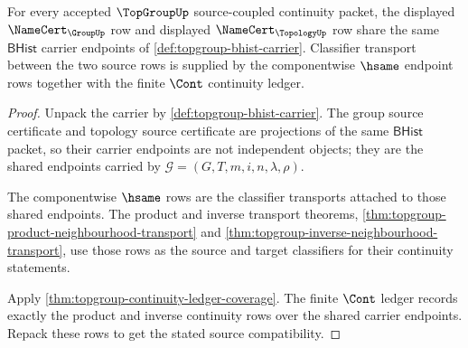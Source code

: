 \begin{theorem}
\label{thm:topgroup-root-source-compatibility}
For every accepted $\TopGroupUp$ source-coupled continuity packet, the displayed
$\NameCert_{\GroupUp}$ row and displayed $\NameCert_{\TopologyUp}$ row share the
same $\mathsf{BHist}$ carrier endpoints of
\autoref{def:topgroup-bhist-carrier}. Classifier transport between the two
source rows is supplied by the componentwise $\hsame$ endpoint rows together
with the finite $\Cont$ continuity ledger.
\end{theorem}
\begin{proof}
Unpack the carrier by \autoref{def:topgroup-bhist-carrier}. The group source
certificate and topology source certificate are projections of the same
$\mathsf{BHist}$ packet, so their carrier endpoints are not independent
objects; they are the shared endpoints carried by
$\mathcal G=(G,T,m,i,n,\lambda,\rho)$.

The componentwise $\hsame$ rows are the classifier transports attached to those
shared endpoints. The product and inverse transport theorems,
\autoref{thm:topgroup-product-neighbourhood-transport} and
\autoref{thm:topgroup-inverse-neighbourhood-transport}, use those rows as the
source and target classifiers for their continuity statements.

Apply \autoref{thm:topgroup-continuity-ledger-coverage}. The finite $\Cont$
ledger records exactly the product and inverse continuity rows over the shared
carrier endpoints. Repack these rows to get the stated source compatibility.
\end{proof}

